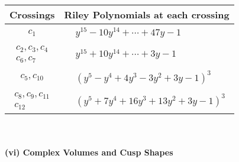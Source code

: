 \documentclass[1p]{elsarticle_modified}
\theoremstyle{definition}
\begin{document}
\begin{tabular}{m{50pt}|m{274pt}}
Crossings & \hspace{64pt}Riley Polynomials at each crossing \\
\hline $$\begin{aligned}c_{1}\end{aligned}$$&$\begin{aligned}
&y^{15}-10 y^{14}+\cdots+47 y-1
\end{aligned}$\\
\hline $$\begin{aligned}c_{2},c_{3},c_{4}\\c_{6},c_{7}\end{aligned}$$&$\begin{aligned}
&y^{15}+10 y^{14}+\cdots+3 y-1
\end{aligned}$\\
\hline $$\begin{aligned}c_{5},c_{10}\end{aligned}$$&$\begin{aligned}
&(y^5- y^4+4 y^3-3 y^2+3 y-1)^3
\end{aligned}$\\
\hline $$\begin{aligned}c_{8},c_{9},c_{11}\\c_{12}\end{aligned}$$&$\begin{aligned}
&(y^5+7 y^4+16 y^3+13 y^2+3 y-1)^3
\end{aligned}$\\
\hline
\end{tabular}\\~\\
\newpage\flushleft \textbf{(vi) Complex Volumes and Cusp Shapes}
\end{document}
